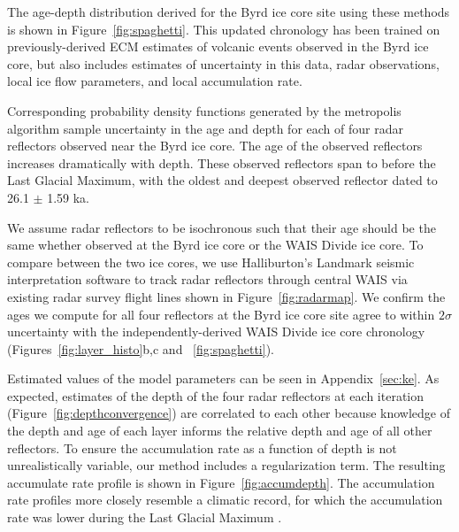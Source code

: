 
The age-depth distribution derived for the Byrd ice core site using these methods is shown in Figure~\ref{fig:spaghetti}. This updated chronology has been trained on previously-derived ECM estimates of volcanic events observed in the Byrd ice core, but also includes estimates of uncertainty in this data, radar observations, local ice flow parameters, and local accumulation rate. 

Corresponding probability density functions generated by the metropolis algorithm sample uncertainty in the age and depth for each of four radar reflectors observed near the Byrd ice core. The age of the observed reflectors increases dramatically with depth.  These observed reflectors span to before the Last Glacial Maximum, with the oldest and deepest observed reflector dated to 26.1 $\pm$ 1.59 ka. 

We assume radar reflectors to be isochronous such that their age should be the same whether observed at the Byrd ice core or the WAIS Divide ice core. To compare between the two ice cores, we use Halliburton's Landmark seismic interpretation software to track radar reflectors through central WAIS via existing radar survey flight lines shown in Figure~\ref{fig:radarmap}. We confirm the ages we compute for all four reflectors at the Byrd ice core site agree to within $2\sigma$ uncertainty with the independently-derived WAIS Divide ice core chronology (Figures~\ref{fig:layer_histo}b,c and ~\ref{fig:spaghetti}).

Estimated values of the model parameters can be seen in Appendix~\ref{sec:ke}. As expected, estimates of the depth of the four radar reflectors at each iteration (Figure~\ref{fig:depthconvergence}) are correlated to each other because knowledge of the depth and age of each layer informs the relative depth and age of all other reflectors. To ensure the accumulation rate as a function of depth is not unrealistically variable, our method includes a regularization term. The resulting accumulate rate profile is shown in Figure~\ref{fig:accumdepth}. The accumulation rate profiles more closely resemble a climatic record, for which the accumulation rate was lower during the Last Glacial Maximum%
. 

